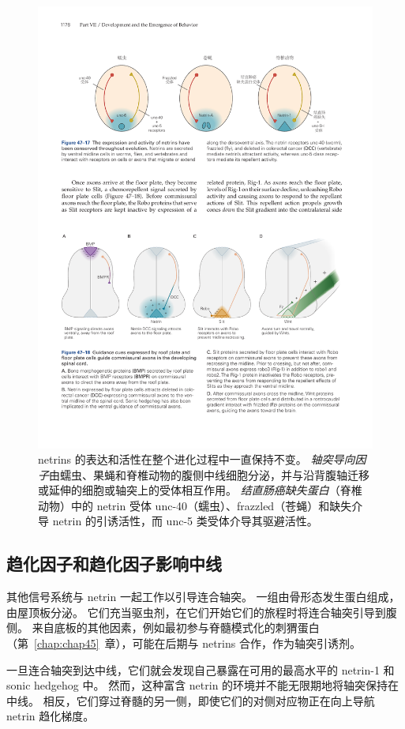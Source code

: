 \begin{figure}[htbp]
	\centering
	\includegraphics[width=0.9\linewidth]{chap47/fig_47_17}
	\caption{netrins 的表达和活性在整个进化过程中一直保持不变。
		\textit{轴突导向因子}由蠕虫、果蝇和脊椎动物的腹侧中线细胞分泌，并与沿背腹轴迁移或延伸的细胞或轴突上的受体相互作用。
		\textit{结直肠癌缺失蛋白}（脊椎动物）中的 netrin 受体 unc-40（蠕虫）、frazzled（苍蝇）和缺失介导 netrin 的引诱活性，而 unc-5 类受体介导其驱避活性。}
	\label{fig:47_17}
\end{figure}



\subsection{趋化因子和趋化因子影响中线}

其他信号系统与 netrin 一起工作以引导连合轴突。
一组由骨形态发生蛋白组成，由屋顶板分泌。
它们充当驱虫剂，在它们开始它们的旅程时将连合轴突引导到腹侧。
来自底板的其他因素，例如最初参与脊髓模式化的刺猬蛋白（第~\ref{chap:chap45}~章），可能在后期与 netrins 合作，作为轴突引诱剂。


一旦连合轴突到达中线，它们就会发现自己暴露在可用的最高水平的 netrin-1 和 sonic hedgehog 中。
然而，这种富含 netrin 的环境并不能无限期地将轴突保持在中线。
相反，它们穿过脊髓的另一侧，即使它们的对侧对应物正在向上导航 netrin 趋化梯度。


